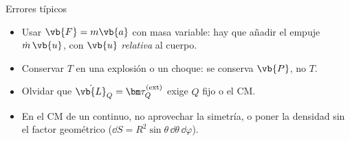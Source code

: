 \begin{clave}[violeta]{Errores típicos}
\begin{itemize}[leftmargin=1.3em]
  \item Usar $\vb{F}=m\vb{a}$ con masa variable: hay que añadir el empuje
        $\dot m\,\vb{u}$, con $\vb{u}$ \emph{relativa} al cuerpo.
  \item Conservar $T$ en una explosión o un choque: se conserva $\vb{P}$, no $T$.
  \item Olvidar que $\dot{\vb{L}}_{Q}=\vtorque_{Q}\ext$ exige $Q$ fijo o el CM.
  \item En el CM de un continuo, no aprovechar la simetría, o poner la
        densidad sin el factor geométrico ($\dd S=R^{2}\sin\theta\,\dd\theta\,\dd\varphi$).
\end{itemize}
\end{clave}
